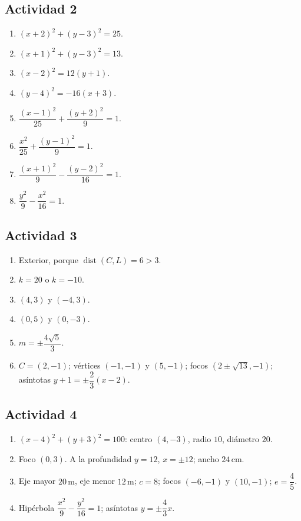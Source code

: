 \documentclass[11pt]{article}
\def\identacion{-2.5mm}%
\begin{document}
\subsection*{Actividad 2}

\begin{enumerate}[\hspace*{\identacion}1)]
\item $(x+2)^2+(y-3)^2=25$.
\item $(x+1)^2+(y-3)^2=13$.
\item $(x-2)^2=12(y+1)$.
\item $(y-4)^2=-16(x+3)$.
\item $\dfrac{(x-1)^2}{25}+\dfrac{(y+2)^2}{9}=1$.
\item $\dfrac{x^2}{25}+\dfrac{(y-1)^2}{9}=1$.
\item $\dfrac{(x+1)^2}{9}-\dfrac{(y-2)^2}{16}=1$.
\item $\dfrac{y^2}{9}-\dfrac{x^2}{16}=1$.
\end{enumerate}

\subsection*{Actividad 3}

\begin{enumerate}[\hspace*{\identacion}1)]
\item Exterior, porque $\operatorname{dist}(C,L)=6>3$.
\item $k=20$ o $k=-10$.
\item $(4,3)$ y $(-4,3)$.
\item $(0,5)$ y $(0,-3)$.
\item $m=\pm\dfrac{4\sqrt5}{3}$.
\item $C=(2,-1)$; vértices $(-1,-1)$ y $(5,-1)$; focos $(2\pm\sqrt{13},-1)$; asíntotas $y+1=\pm\dfrac23(x-2)$.
\end{enumerate}

\subsection*{Actividad 4}

\begin{enumerate}[\hspace*{\identacion}1)]
\item $(x-4)^2+(y+3)^2=100$: centro $(4,-3)$, radio $10$, diámetro $20$.
\item Foco $(0,3)$. A la profundidad $y=12$, $x=\pm12$; ancho $24\,\text{cm}$.
\item Eje mayor $20\,\text{m}$, eje menor $12\,\text{m}$; $c=8$; focos $(-6,-1)$ y $(10,-1)$; $e=\dfrac45$.
\item Hipérbola $\dfrac{x^2}{9}-\dfrac{y^2}{16}=1$; asíntotas $y=\pm\dfrac43x$.
\end{enumerate}
\end{document}
